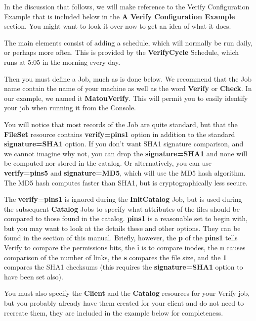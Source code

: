 In the discussion that follows, we will make reference to the Verify
Configuration Example that is included below in the {\bf A Verify
Configuration Example} section. You might want to look it over now to get an
idea of what it does. 

The main elements consist of adding a schedule, which will normally be run
daily, or perhaps more often. This is provided by the {\bf VerifyCycle}
Schedule, which runs at 5:05 in the morning every day. 

Then you must define a Job, much as is done below. We recommend that the Job
name contain the name of your machine as well as the word {\bf Verify} or {\bf
Check}. In our example, we named it {\bf MatouVerify}. This will permit you to
easily identify your job when running it from the Console. 

You will notice that most records of the Job are quite standard, but that the
{\bf FileSet} resource contains {\bf verify=pins1} option in addition to the
standard {\bf signature=SHA1} option. If you don't want SHA1 signature
comparison, and we cannot imagine why not, you can drop the {\bf
signature=SHA1} and none will be computed nor stored in the catalog. Or
alternatively, you can use {\bf verify=pins5} and {\bf signature=MD5}, which
will use the MD5 hash algorithm. The MD5 hash computes faster than SHA1, but
is cryptographically less secure. 

The {\bf verify=pins1} is ignored during the {\bf InitCatalog} Job, but is
used during the subsequent {\bf Catalog} Jobs to specify what attributes of
the files should be compared to those found in the catalog. {\bf pins1} is a
reasonable set to begin with, but you may want to look at the details these
and other options. They can be found in the 
 section of this manual.
Briefly, however, the {\bf p} of the {\bf pins1} tells Verify to compare the
permissions bits, the {\bf i} is to compare inodes, the {\bf n} causes
comparison of the number of links, the {\bf s} compares the file size, and the
{\bf 1} compares the SHA1 checksums (this requires the {\bf signature=SHA1}
option to have been set also). 

You must also specify the {\bf Client} and the {\bf Catalog} resources for
your Verify job, but you probably already have them created for your client
and do not need to recreate them, they are included in the example below for
completeness. 

